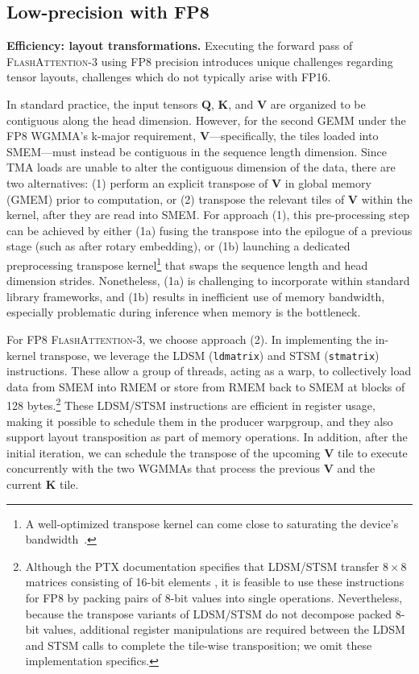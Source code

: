 \begin{algorithm}[H]
\begin{algorithmic}[1]
\subsection{Low-precision with FP8}
\label{sec:algofp8}

\textbf{Efficiency: layout transformations.} Executing the forward pass of \textsc{FlashAttention-3} using FP8 precision introduces unique challenges regarding tensor layouts, challenges which do not typically arise with FP16.

In standard practice, the input tensors $\mathbf{Q}$, $\mathbf{K}$, and $\mathbf{V}$ are organized to be contiguous along the head dimension. However, for the second GEMM under the FP8 WGMMA's k-major requirement, $\mathbf{V}$—specifically, the tiles loaded into SMEM—must instead be contiguous in the sequence length dimension. Since TMA loads are unable to alter the contiguous dimension of the data, there are two alternatives: (1) perform an explicit transpose of $\mathbf{V}$ in global memory (GMEM) prior to computation, or (2) transpose the relevant tiles of $\mathbf{V}$ within the kernel, after they are read into SMEM. For approach (1), this pre-processing step can be achieved by either (1a) fusing the transpose into the epilogue of a previous stage (such as after rotary embedding), or (1b) launching a dedicated preprocessing transpose kernel\footnote{A well-optimized transpose kernel can come close to saturating the device's bandwidth~\citep{colfax_cutlass_transpose_2024}.} that swaps the sequence length and head dimension strides. Nonetheless, (1a) is challenging to incorporate within standard library frameworks, and (1b) results in inefficient use of memory bandwidth, especially problematic during inference when memory is the bottleneck.

For FP8 \textsc{FlashAttention-3}, we choose approach (2). In implementing the in-kernel transpose, we leverage the LDSM (\verb|ldmatrix|) and STSM (\verb|stmatrix|) instructions. These allow a group of threads, acting as a warp, to collectively load data from SMEM into RMEM or store from RMEM back to SMEM at blocks of 128 bytes.\footnote{Although the PTX documentation specifies that LDSM/STSM transfer $8 \times 8$ matrices consisting of 16-bit elements \cite[\S 9.7.13.4.15-16]{ptx}, it is feasible to use these instructions for FP8 by packing pairs of 8-bit values into single operations. Nevertheless, because the transpose variants of LDSM/STSM do not decompose packed 8-bit values, additional register manipulations are required between the LDSM and STSM calls to complete the tile-wise transposition; we omit these implementation specifics.} These LDSM/STSM instructions are efficient in register usage, making it possible to schedule them in the producer warpgroup, and they also support layout transposition as part of memory operations. In addition, after the initial iteration, we can schedule the transpose of the upcoming $\mathbf{V}$ tile to execute concurrently with the two WGMMAs that process the previous $\mathbf{V}$ and the current $\mathbf{K}$ tile.


\end{algorithmic}
\end{algorithm}
